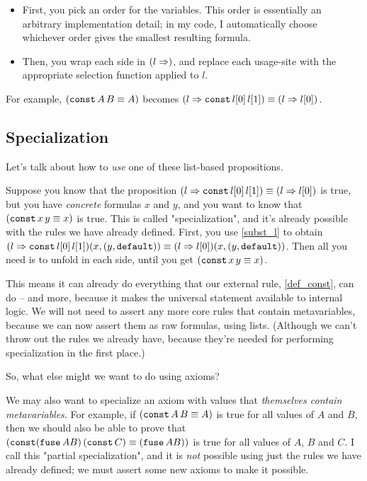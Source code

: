 \documentclass{article}
\begin{document}
  \begin{itemize}
    \item First, you pick an order for the variables. This order is essentially an arbitrary implementation detail; in my code, I automatically choose whichever order gives the smallest resulting formula.
    \item Then, you wrap each side in $(l \Rightarrow)$, and replace each usage-site with the appropriate selection function applied to $l$.
  \end{itemize}
  
  For example, $(\operatorname{\texttt{const}} A\, B \equiv A)$ becomes $(l \Rightarrow \operatorname{\texttt{const}} l[0]\, l[1]) \equiv (l \Rightarrow l[0])$.
  
  
  \subsection{Specialization}
  
  Let's talk about how to \emph{use} one of these list-based propositions.
  
  Suppose you know that the proposition $(l \Rightarrow \operatorname{\texttt{const}} l[0]\, l[1]) \equiv (l \Rightarrow l[0])$ is true, but you have \emph{concrete} formulas $x$ and $y$, and you want to know that $(\operatorname{\texttt{const}} x\, y \equiv x)$ is true. This is called "specialization", and it's already possible with the rules we have already defined. First, you use \eqref{subst_l} to obtain $(l \Rightarrow \operatorname{\texttt{const}} l[0]\, l[1])(x,(y,\operatorname{\texttt{default}})) \equiv (l \Rightarrow l[0])(x,(y,\operatorname{\texttt{default}}))$. Then all you need is to unfold in each side, until you get $(\operatorname{\texttt{const}} x\, y \equiv x)$.
  
  This means it can already do everything that our external rule, \eqref{def_const}, can do – and more, because it makes the universal statement available to internal logic. We will not need to assert any more core rules that contain metavariables, because we can now assert them as raw formulas, using lists. (Although we can't throw out the rules we already have, because they're needed for performing specialization in the first place.)
  
  So, what else might we want to do using axioms?
  
  We may also want to specialize an axiom with values that \emph{themselves contain metavariables}. For example, if $(\operatorname{\texttt{const}} A\, B \equiv A)$ is true for all values of $A$ and $B$, then we should also be able to prove that $(\operatorname{\texttt{const}} (\operatorname{\texttt{fuse}} A B)\, (\operatorname{\texttt{const}} C) \equiv (\operatorname{\texttt{fuse}} A B))$ is true for all values of $A$, $B$ and $C$. I call this "partial specialization", and it is \emph{not} possible using just the rules we have already defined; we must assert some new axioms to make it possible.
  
\end{document}
